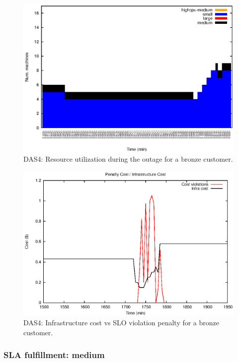 \begin{figure}
  \begin{center}
    \includegraphics[width=.85\linewidth]{images/exps2011/low/das/inst_type_machines_filtered.eps}
  \end{center}
\vspace{-5mm}
  \caption{DAS4: Resource utilization during the outage for a bronze customer.}
  \label{resOutage}
\end{figure}


\begin{figure}
  \begin{center}
    \includegraphics[width=.85\linewidth]{images/exps2011/low/das/penaltyVScost_filtered.eps}
  \end{center}
\vspace{-5mm}
  \caption{DAS4: Infrastructure cost vs SLO violation penalty for a bronze customer.}
  \label{lowPenalty}
\end{figure}

\subsubsection{SLA fulfillment: medium}

